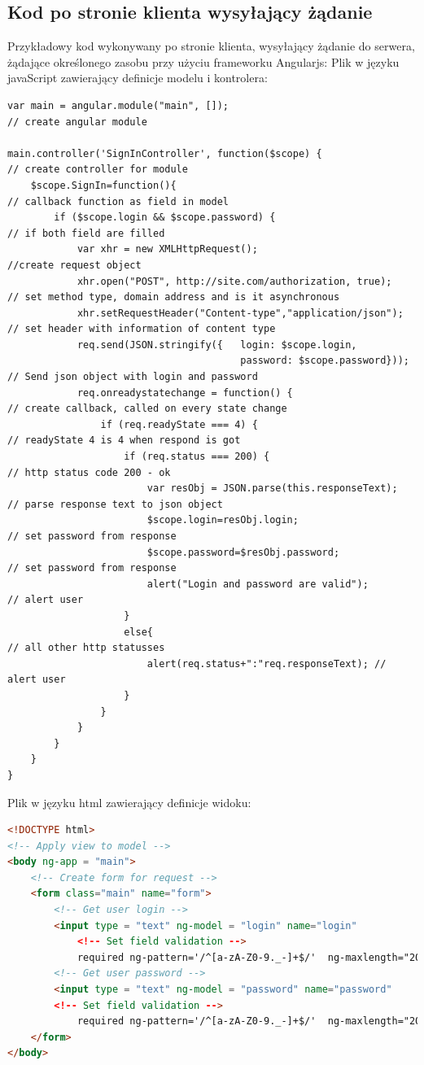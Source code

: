 \documentclass[12pt]{report}
\begin{document}
\subsection{Kod po stronie klienta wysyłający żądanie}
Przykładowy kod wykonywany po stronie klienta, wysyłający żądanie do serwera, żądające określonego zasobu przy użyciu frameworku Angularjs:
Plik w języku javaScript zawierający definicje modelu i kontrolera:
\medskip
\begin{lstlisting}
var main = angular.module("main", []); 									// create angular module

main.controller('SignInController', function($scope) { 					// create controller for module
	$scope.SignIn=function(){ 											// callback function as field in model
		if ($scope.login && $scope.password) {							// if both field are filled
			var xhr = new XMLHttpRequest();									//create request object
			xhr.open("POST", http://site.com/authorization, true);		// set method type, domain address and is it asynchronous
			xhr.setRequestHeader("Content-type","application/json");	// set header with information of content type
			req.send(JSON.stringify({	login: $scope.login,			
										password: $scope.password})); 	// Send json object with login and password
			req.onreadystatechange = function() { 						// create callback, called on every state change
				if (req.readyState === 4) { 							// readyState 4 is 4 when respond is got
					if (req.status === 200) { 							// http status code 200 - ok
						var resObj = JSON.parse(this.responseText);		// parse response text to json object
						$scope.login=resObj.login;						// set password from response
						$scope.password=$resObj.password;				// set password from response
						alert("Login and password are valid");			// alert user
					}
					else{ 												// all other http statusses
						alert(req.status+":"req.responseText); // alert user
					}
				}
			}
		}
	}
}
\end{lstlisting}
\newpage
Plik w języku html zawierający definicje widoku:
\begin{lstlisting}[language=HTML]
<!DOCTYPE html> 
<!-- Apply view to model -->
<body ng-app = "main">
	<!-- Create form for request -->
	<form class="main" name="form"> 
		<!-- Get user login -->
		<input type = "text" ng-model = "login" name="login"
			<!-- Set field validation -->
			required ng-pattern='/^[a-zA-Z0-9._-]+$/'  ng-maxlength="20" ng-minlength="3">
		<!-- Get user password -->
		<input type = "text" ng-model = "password" name="password"
		<!-- Set field validation -->
			required ng-pattern='/^[a-zA-Z0-9._-]+$/'  ng-maxlength="20" ng-minlength="3">
	</form>
</body>
\end{lstlisting}
\end{document}
